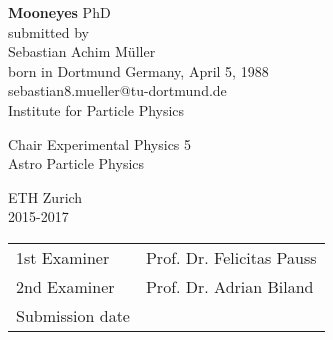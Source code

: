 \documentclass[11pt,a4paper,oneside,titlepage]{book}
\begin{document}
\newcommand{\CppFileStartEnd}[3]{%
    \begin{footnotesize}
    \end{footnotesize}
}

\newcommand{\TxtFile}[1]{%
    \begin{footnotesize}
    \end{footnotesize}
}

\newcommand{\ill}[1]{%
    \begin{lstlisting}#1\end{lstlisting}    
}

\newcommand{\CenFig}[2]{
    \begin{figure}[H]
        \begin{center}
            \texttt{[image: \#1]}
        \end{center}
    \end{figure}
}

\makeatletter
{}
\def\lst@SkipToFirst{%
    \lst@ifmatchrangestart\c@lstnumber=\numexpr-1+\lst@firstline\fi
    \ifnum \lst@lineno<\lst@firstline
        \def\lst@next{\lst@BeginDropInput\lst@Pmode
        \lst@Let{13}\lst@MSkipToFirst
        \lst@Let{10}\lst@MSkipToFirst}%
        \expandafter\lst@next
    \else
        \expandafter\lst@BOLGobble
    \fi}
\makeatother
\newcommand{\thetitle}{Mooneyes}
%
\thispagestyle{empty}
\begin{center}
\Huge\textbf{\thetitle}
%
\vfill
%
\Large
PhD \\
\vspace{20pt}
\normalsize
submitted by \\[5pt]
{\Large Sebastian Achim M\"uller } \\[5pt]
born in Dortmund Germany, April 5, 1988\\[5pt]
%
{\normalsize sebastian8.mueller@tu-dortmund.de}\\
%
\vspace{20pt}
Institute for Particle Physics
\par\smallskip\noindent
Chair Experimental Physics 5\\Astro Particle Physics\\
\par\smallskip\noindent
ETH Zurich\\2015-2017
\end{center}
\newpage
\thispagestyle{empty}
%
\newlength{\vertspace}
\setlength{\vertspace}{5pt}
%
\begin{tabular}{p{1.5in} p{2in}}
    1st Examiner & Prof. Dr. Felicitas Pauss\\[\vertspace]
    2nd Examiner & Prof. Dr. Adrian Biland\\[\vertspace]
    Submission date & \dotfill\\ 
\end{tabular}
\end{document}
